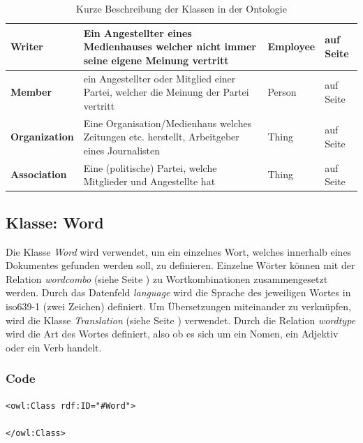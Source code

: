 ﻿\documentclass[
    11pt,
    latin1,
    a4paper,
    oneside
]{scrreprt}
\begin{document}
\begin{table}[h]
\begin{tabular}{ | l | p{5cm} | l | l| }
		\textbf{Writer} & Ein Angestellter eines Medienhauses welcher nicht immer seine eigene Meinung vertritt & Employee & \nameref{sec:class_writer} auf Seite \pageref{sec:class_writer} \\ \hline
		\textbf{Member} & ein Angestellter oder Mitglied einer Partei, welcher die Meinung der Partei vertritt & Person & \nameref{sec:class_member} auf Seite \pageref{sec:class_member} \\ \hline
		\textbf{Organization} & Eine Organisation/Medienhaus welches Zeitungen etc. herstellt, Arbeitgeber eines Journalisten & Thing & \nameref{sec:class_organization} auf Seite \pageref{sec:class_organization} \\ \hline
		\textbf{Association} & Eine (politische) Partei, welche Mitglieder und Angestellte hat & Thing & \nameref{sec:class_association} auf Seite \pageref{sec:class_association} \\ \hline
	\end{tabular}
	\caption{Kurze Beschreibung der Klassen in der Ontologie}
	\label{tbl:classes}
\end{table}


\subsection{Klasse: Word} \label{sec:class_word}

Die Klasse \emph{Word} wird verwendet, um ein einzelnes Wort, welches innerhalb eines Dokumentes gefunden werden soll, zu definieren. Einzelne W\"orter k\"onnen mit der Relation \emph{wordcombo} (siehe  Seite \pageref{sec:rel_wordcombo}) zu Wortkombinationen zusammengesetzt werden. Durch das Datenfeld \emph{language} wird die Sprache des jeweiligen Wortes in iso639-1 (zwei Zeichen) definiert. Um \"Ubersetzungen miteinander zu verknüpfen, wird die Klasse \emph{Translation} (siehe  Seite \pageref{sec:class_translation}) verwendet. Durch die Relation \emph{wordtype} wird die Art des Wortes definiert, also ob es sich um ein Nomen, ein Adjektiv oder ein Verb handelt.

\subsubsection{Code}  \label{sec:class_word_code}

\texttt{<owl:Class rdf:ID="#Word"> \\
	\\
</owl:Class> }
\end{document}
